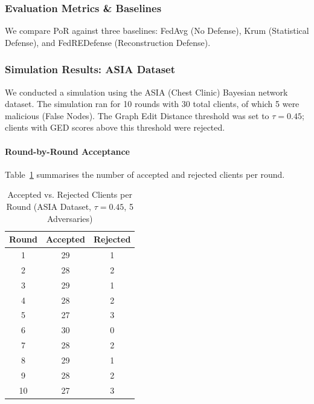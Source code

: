 \documentclass[journal]{IEEEtran}
\begin{document}
\subsubsection{Evaluation Metrics \& Baselines}

We compare PoR against three baselines: FedAvg (No Defense), Krum (Statistical Defense), and FedREDefense (Reconstruction Defense).

\begin{table}[h]
\centering
\caption{Evaluation metrics and success criteria.}
\end{table}

\subsubsection{Simulation Results: ASIA Dataset}

We conducted a simulation using the ASIA (Chest Clinic) Bayesian network dataset. The simulation ran for 10 rounds with 30 total clients, of which 5 were malicious (False Nodes). The Graph Edit Distance threshold was set to $\tau = 0.45$; clients with GED scores above this threshold were rejected.

\paragraph{Round-by-Round Acceptance}

Table~\ref{tab:asia_rounds} summarises the number of accepted and rejected clients per round.

\begin{table}[h]
\centering
\caption{Accepted vs. Rejected Clients per Round (ASIA Dataset, $\tau = 0.45$, 5 Adversaries)}
\label{tab:asia_rounds}
\begin{tabular}{|c|c|c|}
\hline
\textbf{Round} & \textbf{Accepted} & \textbf{Rejected} \\
\hline
1 & 29 & 1 \\
2 & 28 & 2 \\
3 & 29 & 1 \\
4 & 28 & 2 \\
5 & 27 & 3 \\
6 & 30 & 0 \\
7 & 28 & 2 \\
8 & 29 & 1 \\
9 & 28 & 2 \\
10 & 27 & 3 \\
\hline
\end{tabular}
\end{table}
\end{document}
